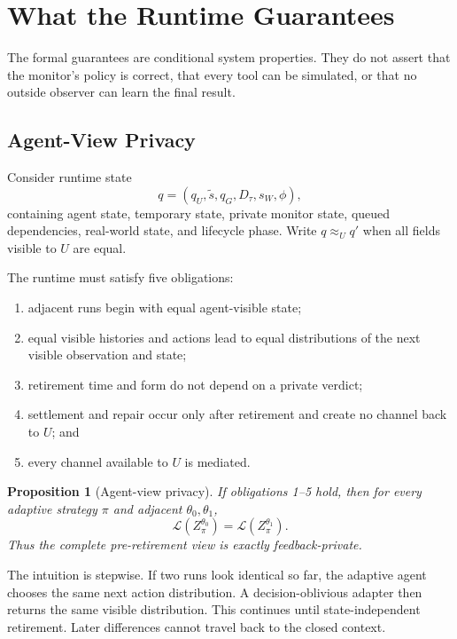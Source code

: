 \documentclass[10pt]{article}
\newtheorem{proposition}{Proposition}
\begin{document}
\section{What the Runtime Guarantees}

The formal guarantees are conditional system properties. They do not assert that the monitor's policy is correct, that every tool can be simulated, or that no outside observer can learn the final result.

\subsection{Agent-View Privacy}

Consider runtime state
\begin{equation}
q=(q_U,\tilde s,q_G,D_\tau,s_W,\phi),
\end{equation}
containing agent state, temporary state, private monitor state, queued dependencies, real-world state, and lifecycle phase. Write $q\approx_U q'$ when all fields visible to $U$ are equal.

The runtime must satisfy five obligations:
\begin{enumerate}
    \item adjacent runs begin with equal agent-visible state;
    \item equal visible histories and actions lead to equal distributions of the next visible observation and state;
    \item retirement time and form do not depend on a private verdict;
    \item settlement and repair occur only after retirement and create no channel back to $U$; and
    \item every channel available to $U$ is mediated.
\end{enumerate}

\begin{proposition}[Agent-view privacy]
\label{prop:unwinding}
If obligations 1--5 hold, then for every adaptive strategy $\pi$ and adjacent $\theta_0,\theta_1$,
\begin{equation}
\mathcal L(Z^{\theta_0}_\pi)=\mathcal L(Z^{\theta_1}_\pi).
\end{equation}
Thus the complete pre-retirement view is exactly feedback-private.
\end{proposition}

The intuition is stepwise. If two runs look identical so far, the adaptive agent chooses the same next action distribution. A decision-oblivious adapter then returns the same visible distribution. This continues until state-independent retirement. Later differences cannot travel back to the closed context.
\end{document}
